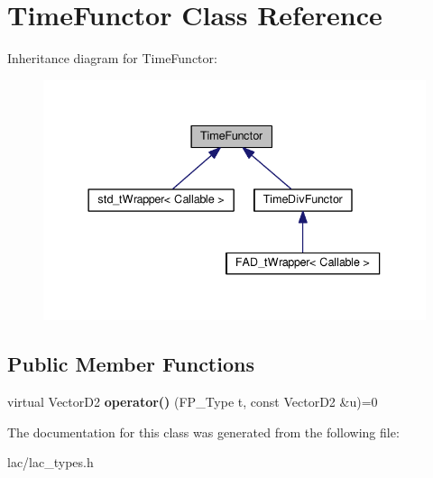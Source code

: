 \hypertarget{classTimeFunctor}{}\section{Time\+Functor Class Reference}
\label{classTimeFunctor}


Inheritance diagram for Time\+Functor\+:\nopagebreak
\begin{figure}[H]
\begin{center}
\leavevmode
\includegraphics[width=337pt]{classTimeFunctor__inherit__graph}
\end{center}
\end{figure}
\subsection*{Public Member Functions}
\begin{DoxyCompactItemize}
\item 
\mbox{\label{classTimeFunctor_a70a13b078de40b96485ee4685d23a63f}} 
virtual Vector\+D2 {\bfseries operator()} (F\+P\+\_\+\+Type t, const Vector\+D2 \&u)=0
\end{DoxyCompactItemize}


The documentation for this class was generated from the following file\+:\begin{DoxyCompactItemize}
\item 
lac/lac\+\_\+types.\+h\end{DoxyCompactItemize}
